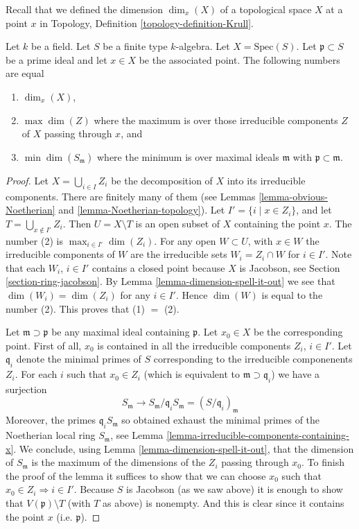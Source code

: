 \noindent
Recall that we defined the
dimension $\dim_x(X)$ of a topological space $X$ at a point $x$
in Topology, Definition \ref{topology-definition-Krull}.

\begin{lemma}
\label{lemma-dimension-at-a-point-finite-type-over-field}
Let $k$ be a field.
Let $S$ be a finite type $k$-algebra.
Let $X = \text{Spec}(S)$.
Let $\mathfrak p \subset S$ be a prime ideal and let
$x \in X$ be the associated point.
The following numbers are equal
\begin{enumerate}
\item $\dim_x(X)$,
\item $\max \dim(Z)$ where the maximum is over those
irreducible components $Z$ of $X$ passing through $x$, and
\item $\min \dim(S_{\mathfrak m})$ where the minimum
is over maximal ideals $\mathfrak m$ with
$\mathfrak p \subset \mathfrak m$.
\end{enumerate}
\end{lemma}

\begin{proof}
Let $X = \bigcup_{i \in I} Z_i$ be the decomposition of $X$ into
its irreducible components. There are finitely many of
them (see 
Lemmas \ref{lemma-obvious-Noetherian} and \ref{lemma-Noetherian-topology}).
Let $I' = \{i \mid x \in Z_i\}$, and let
$T = \bigcup_{x \not \in I'} Z_i$. Then $U = X \setminus T$
is an open subset of $X$ containing the point $x$.
The number (2) is $\max_{i \in I'} \dim(Z_i)$.
For any open $W \subset U$, with $x \in W$
the irreducible components of $W$ are the irreducible sets
$W_i = Z_i \cap W$ for $i \in I'$.
Note that each $W_i$, $i \in I'$ contains a closed point because
$X$ is Jacobson, see Section \ref{section-ring-jacobson}.
By Lemma \ref{lemma-dimension-spell-it-out} we see that
$\dim(W_i) = \dim(Z_i)$ for any $i \in I'$. Hence $\dim(W)$
is equal to the number (2). This proves that (1) $=$ (2).

\medskip\noindent
Let $\mathfrak m \supset \mathfrak p$ be any maximal ideal
containing $\mathfrak p$. Let $x_0 \in X$ be the corresponding
point. First of all, $x_0$ is contained in all the
irreducible components $Z_i$, $i \in I'$. Let $\mathfrak q_i$
denote the minimal primes of $S$ corresponding to the
irreducible componenents $Z_i$. For each $i$ such that
$x_0 \in Z_i$ (which is equivalent to $\mathfrak m \supset \mathfrak q_i$)
we have a surjection
$$
S_{\mathfrak m} \longrightarrow
S_\mathfrak m/\mathfrak q_i S_\mathfrak m =(S/\mathfrak q_i)_{\mathfrak m}
$$
Moreover, the primes $\mathfrak q_i S_\mathfrak m$ so obtained
exhaust the minimal
primes of the Noetherian local ring $S_{\mathfrak m}$, see
Lemma \ref{lemma-irreducible-components-containing-x}.
We conclude, using Lemma \ref{lemma-dimension-spell-it-out},
that the dimension of $S_{\mathfrak m}$ is the
maximum of the dimensions of the $Z_i$ passing through $x_0$.
To finish the proof of the lemma it suffices to show that
we can choose $x_0$ such that $x_0 \in Z_i \Rightarrow i \in I'$.
Because $S$ is Jacobson (as we saw above)
it is enough to show that $V(\mathfrak p) \setminus T$
(with $T$ as above) is nonempty. And this is clear since it
contains the point $x$ (i.e. $\mathfrak p$).
\end{proof}

